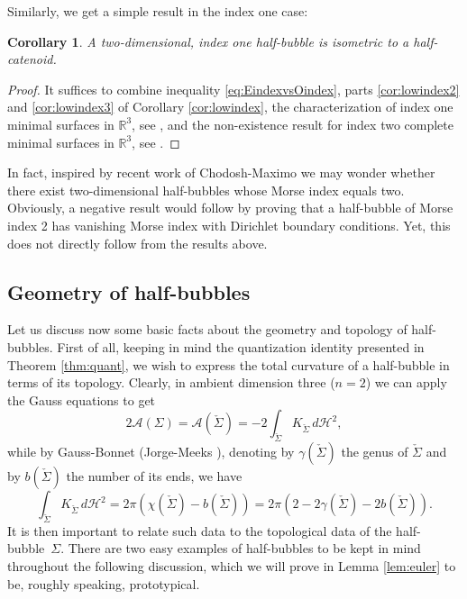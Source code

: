 \documentclass[JEP,XML,SOM,Unicode]{cedram}
\let\mathcal\mathscr
\newcounter{cas}
\newtheorem{cor}[thm]{Corollary}
\theoremstyle{definition}
\newcommand{\R}{\mathbb{R}}
\newcommand{\h}{\mathscr{H}}
\begin{document}
\pagebreak[2]
Similarly, we get a simple result in the index one case:

\begin{cor}\label{cor:indexone}
A two-dimensional, index one half-bubble is isometric to a half-catenoid.
\end{cor}

\begin{proof}
It suffices to combine inequality \eqref{eq:EindexvsOindex}, parts \eqref{cor:lowindex2} and \eqref{cor:lowindex3} of Corollary \ref{cor:lowindex}, the characterization of index one minimal surfaces in $\R^3$, see \cite{LR89}, and the non-existence result for index two complete minimal surfaces in $\R^3$, see \cite{CM14}.
\end{proof}

In fact, inspired by recent work of Chodosh-Maximo \cite{CM14} we may wonder whether there exist two-dimensional half-bubbles whose Morse index equals two.
Obviously, a negative result would follow by proving that a half-bubble of Morse index 2 has vanishing Morse index with Dirichlet boundary conditions. Yet, this does not directly follow from the results above.

\subsection{Geometry of half-bubbles}\label{subs:geomhalf}

Let us discuss now some basic facts about the geometry and topology of half-bubbles. First of all, keeping in mind the quantization identity presented in Theorem \ref{thm:quant}, we wish to express the total curvature of a half-bubble in terms of its topology.
Clearly, in ambient dimension three ($n=2$) we can apply the Gauss equations to get
\begin{equation}\label{eq:half2nd}
2\mathcal{A}(\Sigma)=\mathcal{A}(\check{\Sigma})=-2\int_{\check{\Sigma}} K_{\check{\Sigma}}\,d\h^2,
\end{equation}
while by Gauss-Bonnet (\cf Jorge-Meeks \cite{JM83}), denoting by $\gamma(\check{\Sigma})$ the genus of $\check{\Sigma}$ and by $b(\check{\Sigma})$ the number of its ends, we have
\begin{equation}\label{eq:GBcomplete}
\int_{\check{\Sigma}} K_{\check{\Sigma}}\,d\h^2=2\pi (\chi(\check{\Sigma})-b(\check{\Sigma}))=2\pi(2-2\gamma(\check{\Sigma})-2b(\check{\Sigma})) .
\end{equation}
It is then important to relate such data to the topological data of the half-bubble~$\Sigma$. There are two easy examples of half-bubbles to be kept in mind throughout the following discussion, which we will prove in Lemma \ref{lem:euler} to be, roughly speaking, prototypical.
\end{document}
